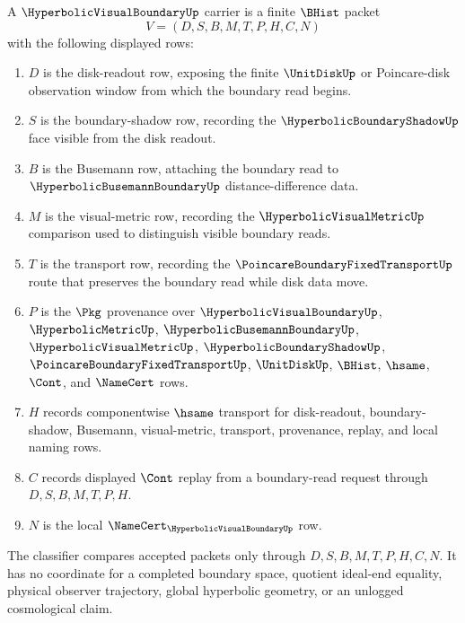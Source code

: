 \begin{definition}
\label{def:hyperbolic-visual-boundary-carrier}
A $\HyperbolicVisualBoundaryUp$ carrier is a finite $\BHist$ packet
$$
V=(D,S,B,M,T,P,H,C,N)
$$
with the following displayed rows:
\begin{enumerate}
\item $D$ is the disk-readout row, exposing the finite $\UnitDiskUp$ or Poincare-disk observation window from which the boundary read begins.
\item $S$ is the boundary-shadow row, recording the $\HyperbolicBoundaryShadowUp$ face visible from the disk readout.
\item $B$ is the Busemann row, attaching the boundary read to $\HyperbolicBusemannBoundaryUp$ distance-difference data.
\item $M$ is the visual-metric row, recording the $\HyperbolicVisualMetricUp$ comparison used to distinguish visible boundary reads.
\item $T$ is the transport row, recording the $\PoincareBoundaryFixedTransportUp$ route that preserves the boundary read while disk data move.
\item $P$ is the $\Pkg$ provenance over $\HyperbolicVisualBoundaryUp$, $\HyperbolicMetricUp$, $\HyperbolicBusemannBoundaryUp$, $\HyperbolicVisualMetricUp$, $\HyperbolicBoundaryShadowUp$, $\PoincareBoundaryFixedTransportUp$, $\UnitDiskUp$, $\BHist$, $\hsame$, $\Cont$, and $\NameCert$ rows.
\item $H$ records componentwise $\hsame$ transport for disk-readout, boundary-shadow, Busemann, visual-metric, transport, provenance, replay, and local naming rows.
\item $C$ records displayed $\Cont$ replay from a boundary-read request through $D,S,B,M,T,P,H$.
\item $N$ is the local $\NameCert_{\HyperbolicVisualBoundaryUp}$ row.
\end{enumerate}
The classifier compares accepted packets only through $D,S,B,M,T,P,H,C,N$. It has no coordinate for a completed boundary space, quotient ideal-end equality, physical observer trajectory, global hyperbolic geometry, or an unlogged cosmological claim.
\end{definition}

